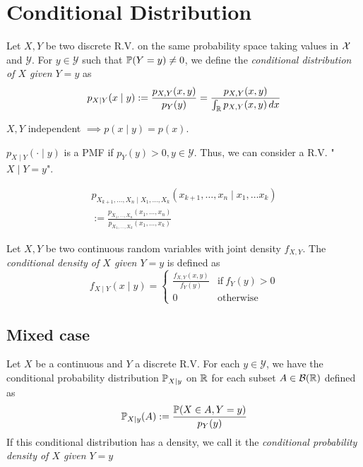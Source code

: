 \section{Conditional Distribution}
\begin{ddefinition*}
  Let \(X, Y\) be two discrete R.V. on the same probability space taking values in \(\DX\) and \(\mathcal{Y}\). For \(y \in \mathcal{Y}\) such that \(\P(Y = y) \neq 0\), we define the \textit{conditional distribution of \(X\) given \(Y = y\)} as
  \[p_{X \mid Y}(x \mid y) := \frac{p_{X, Y}(x, y)}{p_Y(y)} = \frac{p_{X, Y}(x, y)}{\int_\R p_{X, Y}(x, y) \,dx}\]
\end{ddefinition*}

\begin{proposition}
  \(X, Y\) independent \(\implies p(x \mid y) = p(x)\).
\end{proposition}

\begin{proposition}
  \(p_{X \mid Y}(\cdot \mid y)\) is a PMF if \(p_Y(y) > 0, y \in \mathcal{Y}\).
  Thus, we can consider a R.V. "\(X \mid Y = y\)".
\end{proposition}

\begin{dtheorem*} \vspace{-10pt}
  \begin{multline*}
    p_{X_{k+1}, \ldots, X_n \mid X_1, \ldots, X_k}(x_{k+1}, \ldots, x_n \mid x_1, \ldots x_k) \\
    := \frac{p_{X_1, \ldots, X_n}(x_1, \ldots, x_n)}{p_{X_1, \ldots, X_k}(x_1, \ldots, x_k)}
  \end{multline*}
\end{dtheorem*}

\begin{cdefinition*}
  Let \(X, Y\) be two continuous random variables with joint density \(f_{X, Y}\). The \textit{conditional density of \(X\) given \(Y = y\)} is defined as
  \[f_{X \mid Y}(x \mid y) = \begin{cases}
    \frac{f_{X, Y}(x, y)}{f_Y(y)} & \text{if} \ f_Y(y) > 0 \\
    0 & \text{otherwise}
  \end{cases}\]
\end{cdefinition*}

\subsection{Mixed case}
\begin{definition*}
  Let \(X\) be a continuous and \(Y\) a discrete R.V. For each \(y \in \mathcal{Y}\), we have the conditional probability distribution \(\P_{X \mid y}\) on \(\R\) for each subset \(A \in \B(\R)\) defined as
  \[\P_{X \mid y}(A) := \frac{\P(X \in A, Y = y)}{p_Y(y)}\]
  If this conditional distribution has a density, we call it the \textit{conditional probability density of \(X\) given \(Y = y\)}
\end{definition*}

